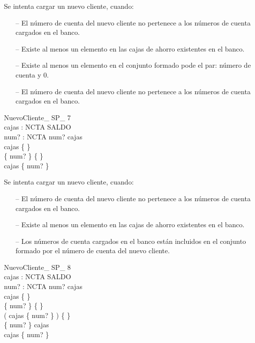 \begin{tcolorbox}[colback=gray!5!white,colframe=gray!50!black,
  colbacktitle=gray!75!black,title=NuevoCliente\_SP\_6]
  Se intenta cargar un nuevo cliente, cuando:
     \begin{itemize}
        \item[--]{El número de cuenta del nuevo cliente no pertenece a los números de cuenta cargados en el banco.}
        \item[--]{Existe al menos un elemento en las cajas de ahorro existentes en el banco.}
        \item[--]{Existe al menos un elemento en el conjunto formado pode el par: número de cuenta y 0.}
        \item[--]{El número de cuenta del nuevo cliente no pertenece a los números de cuenta cargados en el banco.}
     \end{itemize}
\end{tcolorbox}


\begin{schema}{NuevoCliente\_ SP\_ 7}\\
 cajas : NCTA \pfun SALDO \\
 num? : NCTA 
\where
 num? \notin \dom cajas \\
 cajas \neq \{ \} \\
 \{ num?  \} \neq \{ \} \\
 \dom cajas \subset \dom \{ num?  \}
\end{schema}

\begin{tcolorbox}[colback=gray!5!white,colframe=gray!50!black,
  colbacktitle=gray!75!black,title=NuevoCliente\_SP\_7]
  Se intenta cargar un nuevo cliente, cuando:
     \begin{itemize}
        \item[--]{El número de cuenta del nuevo cliente no pertenece a los números de cuenta cargados en el banco.}
        \item[--]{Existe al menos un elemento en las cajas de ahorro existentes en el banco.}
        \item[--]{Los números de cuenta cargados en el banco están incluidos en el conjunto formado por el número de cuenta del nuevo cliente.}
     \end{itemize}
\end{tcolorbox}


\begin{schema}{NuevoCliente\_ SP\_ 8}\\
 cajas : NCTA \pfun SALDO \\
 num? : NCTA 
\where
 num? \notin \dom cajas \\
 cajas \neq \{ \} \\
 \{ num?  \} \neq \{ \} \\
 ( \dom cajas \cap \dom \{ num?  \} ) \neq \{ \} \\
 \lnot \dom \{ num?  \} \subseteq \dom cajas \\
 \lnot \dom cajas \subseteq \dom \{ num?  \}
\end{schema}

